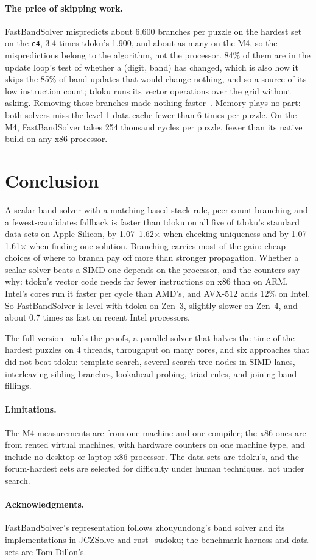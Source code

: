 \documentclass[11pt]{article}
\theoremstyle{definition}
\theoremstyle{plain}
\begin{document}
\paragraph{The price of skipping work.} FastBandSolver mispredicts about 6{,}600 branches per puzzle on the hardest
set on the \texttt{c4}, 3.4 times tdoku's 1{,}900, and about as many on the M4, so the mispredictions belong to the
algorithm, not the processor. 84\% of them are in the update loop's test of whether a (digit, band) has changed, which
is also how it skips the 85\% of band updates that would change nothing, and so a source of its low instruction count;
tdoku runs its vector operations over the grid without asking. Removing those branches made nothing
faster~\cite{kelly2026full}. Memory plays no part: both solvers miss the level-1 data cache fewer than 6 times per
puzzle. On the M4, FastBandSolver takes 254 thousand cycles per puzzle, fewer than its native build on any x86
processor.

\section{Conclusion}

A scalar band solver with a matching-based stack rule, peer-count branching and a fewest-candidates fallback is faster
than tdoku on all five of tdoku's standard data sets on Apple Silicon, by 1.07--1.62$\times$ when checking uniqueness
and by 1.07--1.61$\times$ when finding one solution. Branching carries most of the gain: cheap choices of where to
branch pay off more than stronger propagation. Whether a scalar solver beats a SIMD one depends on the processor, and
the counters say why: tdoku's vector code needs far fewer instructions on x86 than on ARM, Intel's cores run it faster
per cycle than AMD's, and AVX-512 adds 12\% on Intel. So FastBandSolver is level with tdoku on Zen~3, slightly slower on
Zen~4, and about 0.7 times as fast on recent Intel processors.

The full version~\cite{kelly2026full} adds the proofs, a parallel solver that halves the time of the hardest puzzles
on 4 threads, throughput on many cores, and six approaches that did not beat tdoku: template search, several
search-tree nodes in SIMD lanes, interleaving sibling branches, lookahead probing, triad rules, and joining band
fillings.

\paragraph{Limitations.} The M4 measurements are from one machine and one compiler; the x86 ones are from rented
virtual machines, with hardware counters on one machine type, and include no desktop or laptop x86 processor. The data
sets are tdoku's, and the forum-hardest sets are selected for difficulty under human techniques, not under search.

\paragraph{Acknowledgments.} FastBandSolver's representation follows zhouyundong's band solver and its implementations
in JCZSolve and rust\_sudoku; the benchmark harness and data sets are Tom Dillon's.



\end{document}
